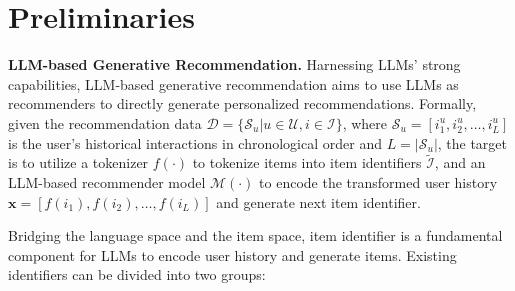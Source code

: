 \section{Preliminaries}\label{sec:task_formulation}

\vspace{2pt}
\noindent\textbf{LLM-based Generative Recommendation.} 
Harnessing LLMs' strong capabilities, LLM-based generative recommendation aims to use LLMs as recommenders to directly generate personalized recommendations. 
Formally, given the recommendation data 
$\mathcal{D}=\{\mathcal{S}_u|u\in\mathcal{U}, i\in\mathcal{I}\}$, where $\mathcal{S}_u = [i_1^{u}, i_2^{u}, \dots, i_L^{u}]$ is the user's historical interactions in chronological order and $L=|\mathcal{S}_u|$, 
the target is to utilize a tokenizer $f(\cdot)$ to tokenize items into item identifiers $\tilde{\mathcal{I}}$, 
and an LLM-based recommender model $\mathcal{M}(\cdot)$ to encode the transformed user history $\bm{x}= [f(i_{1}), f(i_{2}), \dots, f(i_{L})]$ and generate next item identifier. 


\vspace{2pt}
Bridging the language space and the item space, item identifier is a fundamental component for LLMs to encode user history and generate items. 
Existing identifiers can be divided into two groups:

